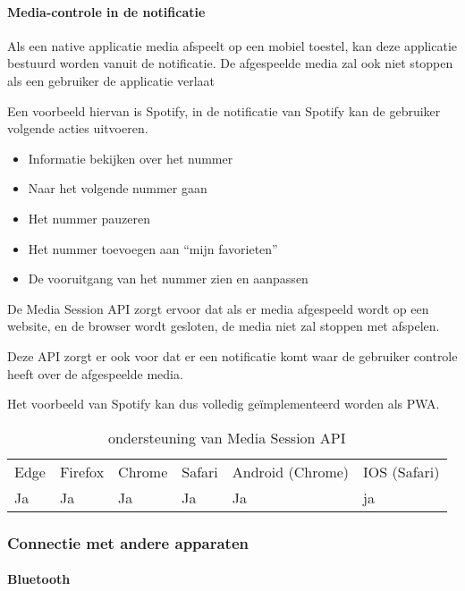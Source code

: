 \paragraph{Media-controle in de notificatie }


Als een native applicatie media afspeelt op een mobiel toestel, kan deze applicatie bestuurd worden vanuit de notificatie. De afgespeelde media zal ook niet stoppen als een gebruiker de applicatie verlaat

Een voorbeeld hiervan is Spotify, in de notificatie van Spotify kan de gebruiker volgende acties uitvoeren.
 \begin{itemize}
   \item	Informatie bekijken over het nummer
   \item	Naar het volgende nummer gaan
   \item	Het nummer pauzeren
   \item	Het nummer toevoegen aan “mijn favorieten”
   \item	De vooruitgang van het nummer zien en aanpassen
\end{itemize}
De Media Session API \autocite{Beaufort2019} zorgt ervoor dat als er media afgespeeld wordt op een website, en de browser wordt gesloten, de media niet zal stoppen met afspelen.

Deze API zorgt er ook voor dat er een notificatie komt waar de gebruiker controle heeft over de afgespeelde media. 

Het voorbeeld van Spotify kan dus volledig geïmplementeerd worden als PWA.

\begin{table}[]
	\begin{tabular}{llllll}
		Edge & Firefox & Chrome & Safari & Android (Chrome) & IOS (Safari) \\
		Ja   & Ja      & Ja     & Ja     & Ja               & ja          
	\end{tabular}	
	\caption{ondersteuning van Media Session API}
	\label{oondersteuning van Media Session API}
\end{table}



\subsubsection{Connectie met andere apparaten}



\paragraph{Bluetooth }

